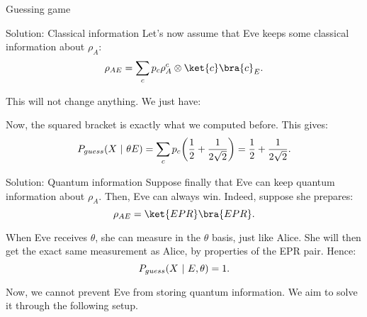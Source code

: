 \documentclass[a4paper]{article}
\begin{document}
\begin{parag}{Guessing game}
    \begin{subparag}{Solution: Classical information}
        Let's now assume that Eve keeps some classical information about $\rho_A$: 
        \[\rho_{AE} = \sum_{c} p_c \rho_A^c \otimes \ket{c}\bra{c}_E.\]
        
        This will not change anything. We just have: 

        Now, the squared bracket is exactly what we computed before. This gives:
        \[P_{guess}\left(X \suchthat \theta E\right) = \sum_{c} p_c \left(\frac{1}{2}+ \frac{1}{2 \sqrt{2}}\right) = \frac{1}{2} + \frac{1}{2 \sqrt{2}}.\]
    \end{subparag}

    \begin{subparag}{Solution: Quantum information}
        Suppose finally that Eve can keep quantum information about $\rho_A$. Then, Eve can always win. Indeed, suppose she prepares: 
        \[\rho_{AE} = \ket{EPR}\bra{EPR}.\]

        When Eve receives $\theta$, she can measure in the $\theta$ basis, just like Alice. She will then get the exact same measurement as Alice, by properties of the EPR pair. Hence: 
        \[P_{guess}\left(X \suchthat E, \theta\right) = 1.\]

        Now, we cannot prevent Eve from storing quantum information. We aim to solve it through the following setup.
    \end{subparag}
\end{parag}
\end{document}
